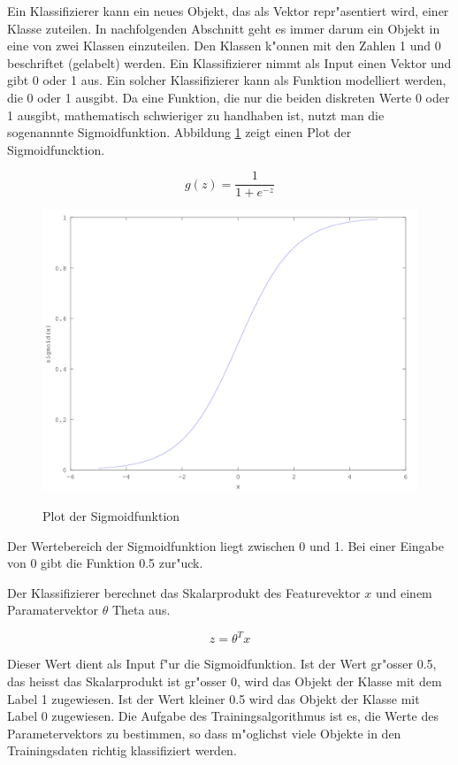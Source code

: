 \documentclass[12pt,a4paper,twoside]{article}
\begin{document}
Ein Klassifizierer kann ein neues Objekt, das als Vektor repr"asentiert wird, einer Klasse zuteilen. In nachfolgenden Abschnitt geht es immer darum ein Objekt in eine von zwei Klassen einzuteilen. Den Klassen k"onnen mit den Zahlen 1 und 0 beschriftet (gelabelt) werden. Ein Klassifizierer nimmt als Input einen Vektor und gibt 0 oder 1 aus. Ein solcher Klassifizierer kann als Funktion modelliert werden, die 0 oder 1 ausgibt. Da eine Funktion, die nur die beiden diskreten Werte 0 oder 1 ausgibt, mathematisch schwieriger zu handhaben ist, nutzt man die sogenannnte Sigmoidfunktion. Abbildung \ref{fig:sigmoidfunc} zeigt einen Plot der Sigmoidfuncktion. 

\[
g(z) = \frac{1}{1 + e^{-z}}
\]


\begin{figure}
  \includegraphics[scale=0.5]{sigmoid}
  \centering
  \label{fig:sigmoidfunc}
  \caption{Plot der Sigmoidfunktion}
\end{figure}

Der Wertebereich der Sigmoidfunktion liegt zwischen 0 und 1. Bei einer Eingabe von 0 gibt die Funktion 0.5 zur"uck.

Der Klassifizierer berechnet das Skalarprodukt des Featurevektor $x$ und einem Paramatervektor $\theta$ Theta aus.

\[
z = \theta^T x
\]

Dieser Wert dient als Input f"ur die Sigmoidfunktion. Ist der Wert gr"osser 0.5, das heisst das Skalarprodukt ist gr"osser 0, wird das Objekt der Klasse mit dem Label 1 zugewiesen. Ist der Wert kleiner 0.5 wird das Objekt der Klasse mit Label 0 zugewiesen. Die Aufgabe des Trainingsalgorithmus ist es, die Werte des Parametervektors zu bestimmen, so dass m"oglichst viele Objekte in den Trainingsdaten richtig klassifiziert werden. 
\end{document}

